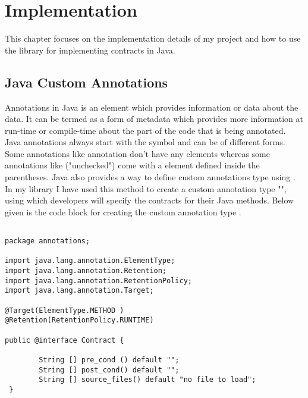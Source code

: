 \chapter{Implementation}

This chapter focuses on the implementation details of my project and how to use the library for implementing contracts in Java.

\section{Java Custom Annotations}

Annotations in Java is an element which provides information or data about the data. It can be termed as a form of metadata which provides more information at run-time or compile-time about the part of the code that is being annotated. Java annotations always start with the \@ symbol and can be of different forms. Some annotations like \@override annotation don't have any elements whereas some annotations like \@SuppressWarnings("unchecked") come with a element defined inside the parentheses. 
Java also provides a way to define custom annotations type using \@interface. In my library I have used this method to create a custom annotation type "\@contract", using which developers will specify the contracts for their Java methods.
Below given is the code block for creating the custom annotation type \@contract.

\begin{minipage}{\linewidth}
\lstset{language=Java, caption=CustomAnnotationtypeJava, captionpos=b, breaklines=true, showstringspaces=false}       
\begin{lstlisting}[frame=single]

package annotations;

import java.lang.annotation.ElementType;
import java.lang.annotation.Retention;
import java.lang.annotation.RetentionPolicy;
import java.lang.annotation.Target;

@Target(ElementType.METHOD )
@Retention(RetentionPolicy.RUNTIME)

public @interface Contract {
		
		String [] pre_cond () default "";
		String [] post_cond() default "";
		String [] source_files() default "no file to load";
 }

\end{lstlisting}
\end{minipage}

